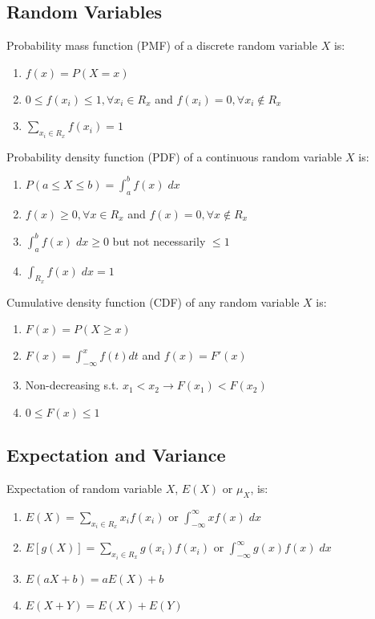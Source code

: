 \documentclass[12pt, a4paper]{article}
\begin{document}
\begin{multicols*}{3}
\colbreak
\section{Random Variables}
Probability mass function (PMF) of a discrete random variable $X$ is:
\begin{enumerate}[\roman*.]
  \item $f(x) = P(X=x)$
  \item $0 \leq f(x_i) \leq 1, \forall x_i\in R_x$ and $f(x_i) = 0,\forall x_i \not\in R_x$
  \item $\sum_{x_i\in R_x} f(x_i) = 1$
\end{enumerate}

Probability density function (PDF) of a continuous random variable $X$ is:
\begin{enumerate}[\roman*.]
  \item $P(a\leq X\leq b) = \int^b_a f(x)\;dx$
  \item $f(x) \geq 0, \forall x\in R_x$ and $f(x) = 0, \forall x \not\in R_x$
  \item $\int_a^b f(x)\;dx \geq 0$ but not necessarily $\leq 1$
  \item $\int_{R_x} f(x)\;dx = 1$
\end{enumerate}

Cumulative density function (CDF) of any random variable $X$ is:
\begin{enumerate}[\roman*.]
  \item $F(x) = P(X \geq x)$
  \item $F(x) = \int^x_{-\infty}f(t)dt$ and $f(x) = F'(x)$
  \item Non-decreasing s.t. $x_1 < x_2 \rightarrow F(x_1) < F(x_2)$ 
  \item $0 \leq F(x) \leq 1$
\end{enumerate}

\subsection{Expectation and Variance}
Expectation of random variable $X$, $E(X)$ or $\mu_X$, is:
\begin{enumerate}[\roman*.]
  \item $E(X) = \sum_{x_i\in R_x} x_if(x_i)$ or $\int^{\infty}_{-\infty}xf(x)\;dx$
  \item $E[g(X)] = \sum_{x_i\in R_x} g(x_i)f(x_i)$ or $\int^{\infty}_{-\infty}g(x)f(x)\;dx$
  \item $E(aX+b) = aE(X) + b$
  \item $E(X+Y) = E(X) + E(Y)$
\end{enumerate}


\end{multicols*}
\end{document}
